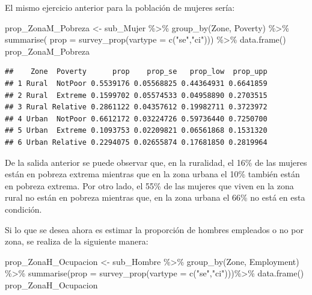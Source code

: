 \documentclass[
  12pt,
]{book}
\newenvironment{Shaded}{\begin{snugshade}}{\end{snugshade}}
\newcommand{\AttributeTok}[1]{\textcolor[rgb]{0.77,0.63,0.00}{#1}}
\newcommand{\FunctionTok}[1]{\textcolor[rgb]{0.00,0.00,0.00}{#1}}
\newcommand{\NormalTok}[1]{#1}
\newcommand{\OtherTok}[1]{\textcolor[rgb]{0.56,0.35,0.01}{#1}}
\newcommand{\SpecialCharTok}[1]{\textcolor[rgb]{0.00,0.00,0.00}{#1}}
\newcommand{\StringTok}[1]{\textcolor[rgb]{0.31,0.60,0.02}{#1}}
\begin{document}
El mismo ejercicio anterior para la población de mujeres sería:

\begin{Shaded}
\begin{Highlighting}[]
\NormalTok{prop\_ZonaM\_Pobreza }\OtherTok{\textless{}{-}}\NormalTok{ sub\_Mujer }\SpecialCharTok{\%\textgreater{}\%} 
                      \FunctionTok{group\_by}\NormalTok{(Zone, Poverty) }\SpecialCharTok{\%\textgreater{}\%} 
                      \FunctionTok{summarise}\NormalTok{( }\AttributeTok{prop =} \FunctionTok{survey\_prop}\NormalTok{(}\AttributeTok{vartype =} \FunctionTok{c}\NormalTok{(}\StringTok{"se"}\NormalTok{,}\StringTok{"ci"}\NormalTok{))) }\SpecialCharTok{\%\textgreater{}\%}
                      \FunctionTok{data.frame}\NormalTok{()}
\NormalTok{prop\_ZonaM\_Pobreza}
\end{Highlighting}
\end{Shaded}

\begin{verbatim}
##    Zone  Poverty      prop    prop_se   prop_low  prop_upp
## 1 Rural  NotPoor 0.5539176 0.05568825 0.44364931 0.6641859
## 2 Rural  Extreme 0.1599702 0.05574533 0.04958890 0.2703515
## 3 Rural Relative 0.2861122 0.04357612 0.19982711 0.3723972
## 4 Urban  NotPoor 0.6612172 0.03224726 0.59736440 0.7250700
## 5 Urban  Extreme 0.1093753 0.02209821 0.06561868 0.1531320
## 6 Urban Relative 0.2294075 0.02655874 0.17681850 0.2819964
\end{verbatim}

De la salida anterior se puede observar que, en la ruralidad, el 16\% de las mujeres están en pobreza extrema mientras que en la zona urbana el 10\% también están en pobreza extrema. Por otro lado, el 55\% de las mujeres que viven en la zona rural no están en pobreza mientras que, en la zona urbana el 66\% no está en esta condición.

Si lo que se desea ahora es estimar la proporción de hombres empleados o no por zona, se realiza de la siguiente manera:

\begin{Shaded}
\begin{Highlighting}[]
\NormalTok{prop\_ZonaH\_Ocupacion }\OtherTok{\textless{}{-}}\NormalTok{ sub\_Hombre }\SpecialCharTok{\%\textgreater{}\%}
                        \FunctionTok{group\_by}\NormalTok{(Zone, Employment) }\SpecialCharTok{\%\textgreater{}\%} 
                        \FunctionTok{summarise}\NormalTok{(}\AttributeTok{prop =} \FunctionTok{survey\_prop}\NormalTok{(}\AttributeTok{vartype =} \FunctionTok{c}\NormalTok{(}\StringTok{"se"}\NormalTok{,}\StringTok{"ci"}\NormalTok{)))}\SpecialCharTok{\%\textgreater{}\%}
                        \FunctionTok{data.frame}\NormalTok{()}
\NormalTok{prop\_ZonaH\_Ocupacion}
\end{Highlighting}
\end{Shaded}
\end{document}
